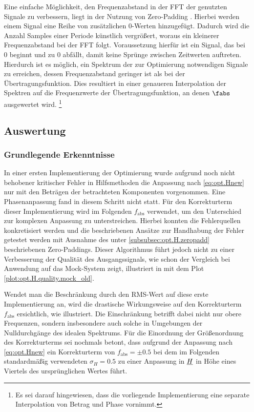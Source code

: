 \documentclass[../Report.tex]{subfiles}
\begin{document}
Eine einfache Möglichkeit, den Frequenzabstand in der FFT der genutzten Signale zu verbessern, liegt in der Nutzung von Zero-Padding \cite{zeropad}. Hierbei werden einem Signal eine Reihe von zusätzlichen 0-Werten hinzugefügt. Dadurch wird die Anzahl Samples einer Periode künstlich vergrößert, woraus ein kleinerer Frequenzabstand bei der FFT folgt. Voraussetzung hierfür ist ein Signal, das bei 0 beginnt und zu 0 abfällt, damit keine Sprünge zwischen Zeitwerten auftreten.
Hierdurch ist es möglich, ein Spektrum der zur Optimierung notwendigen Signale zu erreichen, dessen Frequenzabstand geringer ist als bei der Übertragungsfunktion.
Dies resultiert in einer genaueren Interpolation der Spektren auf die Frequenzwerte der Übertragungsfunktion, an denen $\fabs$ ausgewertet wird.
\footnote{Es sei darauf hingewiesen, dass die vorliegende Implementierung eine separate Interpolation von Betrag und Phase vornimmt.}

 
\newpage
\subsection{Auswertung}
\label{subsec:opt.H.auswertung}

\subsubsection{Grundlegende Erkenntnisse}

In einer ersten Implementierung der Optimierung wurde aufgrund noch nicht behobener kritischer Fehler in Hilfsmethoden die Anpassung nach \eqref{eq:opt.Hnew} nur mit den Beträgen der betrachteten Komponenten vorgenommen. Eine Phasenanpassung fand in diesem Schritt nicht statt. Für den Korrekturterm dieser Implementierung wird im Folgenden $f_{\mathrm{abs}}$ verwendet, um den Unterschied zur komplexen Anpassung zu unterstreichen.
Hierbei konnten die Fehlerquellen konkretisiert werden und die beschriebenen Ansätze zur Handhabung der Fehler getestet werden mit Ausnahme des unter \ref{subsubsec:opt.H.zeropadd} beschriebenen Zero-Paddings.
Dieser Algorithmus führt jedoch nicht zu einer Verbesserung der Qualität des Ausgangssignals, wie schon der Vergleich bei Anwendung auf das Mock-System zeigt, illustriert in  mit dem Plot \ref{plot:opt.H.quality.mock_old}. 

Wendet man die Beschränkung durch den RMS-Wert auf diese erste Implementierung an, wird die drastische Wirkungsweise auf den Korrekturterm $f_{\mathrm{abs}}$ ersichtlich, wie  illustriert. Die Einschränkung betrifft dabei nicht nur obere Frequenzen, sondern insbesondere auch solche in Umgebungen der Nulldurchgänge des idealen Spektrums.
Für die Einordnung der Größenordnung des Korrekturterms sei nochmals betont, dass aufgrund der Anpassung nach \eqref{eq:opt.Hnew} ein Korrekturterm von $f_{\mathrm{abs}} = \pm 0.5$ bei dem im Folgenden standardmäßig verwendeten $\sigma_H = 0.5$ zu einer Anpassung in $\underline{H}$ in Höhe eines Viertels des ursprünglichen Wertes führt.
\end{document}
